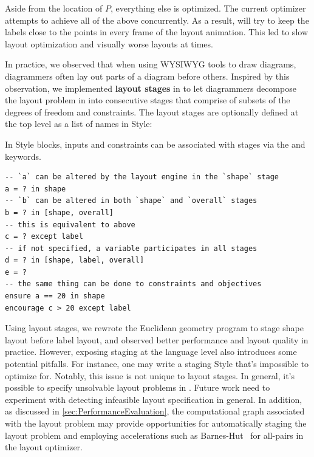 \noindent Aside from the location of $P$, everything else is optimized. The current \Penrose optimizer attempts to achieve all of the above concurrently. As a result, \Penrose will try to keep the labels close to the points in every frame of the layout animation. This led to slow layout optimization and visually worse layouts at times. 

In practice, we observed that when using WYSIWYG tools to draw diagrams, diagrammers often lay out parts of a diagram before others. Inspired by this observation, we implemented \textbf{layout stages} in \Penrose to let diagrammers decompose the layout problem in \Style{} into consecutive stages that comprise of subsets of the degrees of freedom and constraints. The layout stages are optionally defined at the top level as a list of names in Style:

\begin{center}
\noindent{}
\end{center}

In Style blocks, inputs and constraints can be associated with stages via the  and  keywords.

\vspace{1em}
\begin{mdframed}[style=STYCode]
\begin{lstlisting}[language=Sty-Staged,escapechar=@]
-- `a` can be altered by the layout engine in the `shape` stage
a = ? in shape
-- `b` can be altered in both `shape` and `overall` stages
b = ? in [shape, overall]
-- this is equivalent to above
c = ? except label
-- if not specified, a variable participates in all stages
d = ? in [shape, label, overall]
e = ?
-- the same thing can be done to constraints and objectives
ensure a == 20 in shape
encourage c > 20 except label
\end{lstlisting}
\end{mdframed}
\vspace{1em}

Using layout stages, we rewrote the Euclidean geometry \Style program to stage shape layout before label layout, and observed better performance and layout quality in practice. However, exposing staging at the language level also introduces some potential pitfalls. For instance, one may write a staging Style that's impossible to optimize for. Notably, this issue is not unique to layout stages. In general, it's possible to specify unsolvable layout problems in \Style. Future work need to experiment with detecting infeasible layout specification in general. In addition, as discussed in \cref{sec:PerformanceEvaluation}, the computational graph associated with the layout problem may provide opportunities for automatically staging the layout problem and employing accelerations such as Barnes-Hut~\cite{Barnes:1986:barneshut} for all-pairs in the layout optimizer. 

